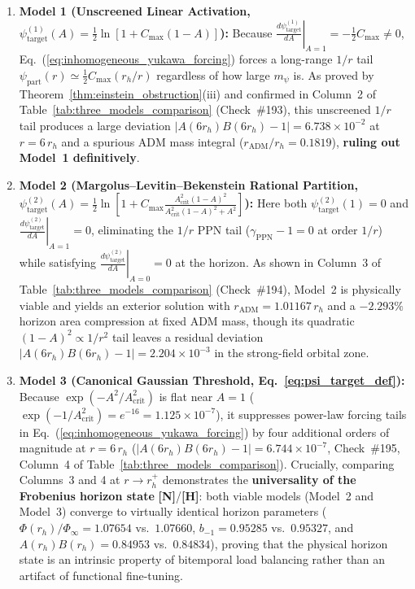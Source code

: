 \documentclass[11pt,a4paper]{article}
\newcommand{\catH}{\textbf{\textcolor{orange!85!black}{[H]}}}
\newcommand{\catN}{\textbf{\textcolor{teal!75!black}{[N]}}}
\theoremstyle{definition}
\theoremstyle{remark}
\begin{document}
\begin{enumerate}
  \item \textbf{Model 1 (Unscreened Linear Activation, $\psi_{\text{target}}^{(1)}(A) = \frac{1}{2}\ln[1 + C_{\max}(1 - A)]$):} Because $\left.\frac{d\psi_{\text{target}}^{(1)}}{dA}\right|_{A=1} = -\frac{1}{2}C_{\max} \neq 0$, Eq.~(\ref{eq:inhomogeneous_yukawa_forcing}) forces a long-range $1/r$ tail $\psi_{\text{part}}(r) \simeq \frac{1}{2}C_{\max}(r_h/r)$ regardless of how large $m_{\psi}$ is. As proved by Theorem~\ref{thm:einstein_obstruction}(iii) and confirmed in Column~2 of Table~\ref{tab:three_models_comparison} (Check~\#193), this unscreened $1/r$ tail produces a large deviation $|A(6r_h)B(6r_h) - 1| = 6.738 \times 10^{-2}$ at $r = 6\,r_h$ and a spurious ADM mass integral ($r_{\text{ADM}}/r_h = 0.1819$), \textbf{ruling out Model~1 definitively}.
  \item \textbf{Model 2 (Margolus--Levitin--Bekenstein Rational Partition, $\psi_{\text{target}}^{(2)}(A) = \frac{1}{2}\ln[1 + C_{\max}\frac{A_{\text{crit}}^2(1-A)^2}{A_{\text{crit}}^2(1-A)^2 + A^2}]$):} Here both $\psi_{\text{target}}^{(2)}(1) = 0$ and $\left.\frac{d\psi_{\text{target}}^{(2)}}{dA}\right|_{A=1} = 0$, eliminating the $1/r$ PPN tail ($\gamma_{\text{PPN}} - 1 = 0$ at order $1/r$) while satisfying $\left.\frac{d\psi_{\text{target}}^{(2)}}{dA}\right|_{A=0} = 0$ at the horizon. As shown in Column~3 of Table~\ref{tab:three_models_comparison} (Check~\#194), Model~2 is physically viable and yields an exterior solution with $r_{\text{ADM}} = 1.01167\,r_h$ and a $-2.293\%$ horizon area compression at fixed ADM mass, though its quadratic $(1 - A)^2 \propto 1/r^2$ tail leaves a residual deviation $|A(6r_h)B(6r_h) - 1| = 2.204 \times 10^{-3}$ in the strong-field orbital zone.
  \item \textbf{Model 3 (Canonical Gaussian Threshold, Eq.~\ref{eq:psi_target_def}):} Because $\exp(-A^2/A_{\text{crit}}^2)$ is flat near $A = 1$ ($\exp(-1/A_{\text{crit}}^2) = e^{-16} = 1.125 \times 10^{-7}$), it suppresses power-law forcing tails in Eq.~(\ref{eq:inhomogeneous_yukawa_forcing}) by four additional orders of magnitude at $r = 6\,r_h$ ($|A(6r_h)B(6r_h) - 1| = 6.744 \times 10^{-7}$, Check~\#195, Column~4 of Table~\ref{tab:three_models_comparison}). Crucially, comparing Columns~3 and 4 at $r \to r_h^+$ demonstrates the \textbf{universality of the Frobenius horizon state} \catN/\catH: both viable models (Model~2 and Model~3) converge to virtually identical horizon parameters ($\Phi(r_h)/\Phi_{\infty} = 1.07654$ vs.\ $1.07660$, $b_{-1} = 0.95285$ vs.\ $0.95327$, and $A(r_h)B(r_h) = 0.84953$ vs.\ $0.84834$), proving that the physical horizon state is an intrinsic property of bitemporal load balancing rather than an artifact of functional fine-tuning.
\end{enumerate}
\end{document}
